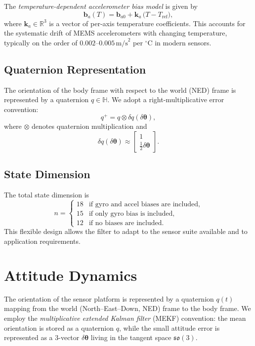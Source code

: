 \documentclass[10pt]{extarticle}
\begin{document}
The \emph{temperature-dependent accelerometer bias model} is given by
\begin{equation}
\bm b_a(T) = \bm b_{a0} + \bm k_a \,\big(T - T_\text{ref}\big),
\label{eq:accel_bias_temp}
\end{equation}
where $\bm k_a \in \mathbb{R}^3$ is a vector of per-axis temperature coefficients. 
This accounts for the systematic drift of MEMS accelerometers with changing temperature, 
typically on the order of $0.002$--$0.005 \,\text{m/s}^2$ per ${}^\circ$C in modern sensors.

\subsection{Quaternion Representation}
The orientation of the body frame with respect to the world (NED) frame is represented by a quaternion $q \in \mathbb{H}$. 
We adopt a right-multiplicative error convention:
\begin{equation}
q^+ = q \otimes \delta q(\delta\bm\theta),
\end{equation}
where $\otimes$ denotes quaternion multiplication and
\begin{equation}
\delta q(\delta\bm\theta) \approx
\begin{bmatrix}
1 \\ \tfrac{1}{2}\delta\bm\theta
\end{bmatrix}.
\label{eq:small_angle_quaternion}
\end{equation}

\subsection{State Dimension}
The total state dimension is
\[
n =
\begin{cases}
18 & \text{if gyro and accel biases are included}, \\
15 & \text{if only gyro bias is included}, \\
12 & \text{if no biases are included}.
\end{cases}
\]
This flexible design allows the filter to adapt to the sensor suite available and to application requirements.

\section{Attitude Dynamics}

The orientation of the sensor platform is represented by a quaternion $q(t)$ mapping from the world 
(North--East--Down, NED) frame to the body frame. 
We employ the \emph{multiplicative extended Kalman filter} (MEKF) convention: 
the mean orientation is stored as a quaternion $q$, while the small attitude error 
is represented as a 3-vector $\delta\bm\theta$ living in the tangent space $\mathfrak{so}(3)$.
\end{document}
